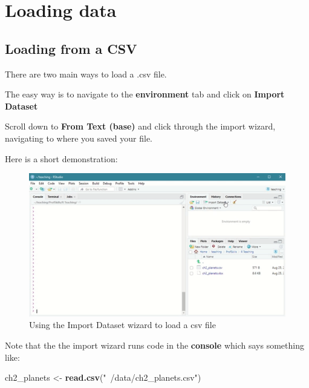\documentclass[
]{book}
\newenvironment{Shaded}{\begin{snugshade}}{\end{snugshade}}
\newcommand{\KeywordTok}[1]{\textcolor[rgb]{0.13,0.29,0.53}{\textbf{#1}}}
\newcommand{\NormalTok}[1]{#1}
\newcommand{\StringTok}[1]{\textcolor[rgb]{0.31,0.60,0.02}{#1}}
\begin{document}
\hypertarget{ex_data_load}{%
\section{Loading data}\label{ex_data_load}}

\hypertarget{loading-from-a-csv}{%
\subsection{Loading from a CSV}\label{loading-from-a-csv}}

There are two main ways to load a .csv file.

The easy way is to navigate to the \textbf{environment} tab and click on \textbf{Import Dataset}

Scroll down to \textbf{From Text (base)} and click through the import wizard, navigating to where you saved your file.

Here is a short demonstration:

\begin{figure}

{\centering \includegraphics{images/03_data/csv_open} 

}

\caption{Using the Import Dataset wizard to load a csv file}\label{fig:unnamed-chunk-58}
\end{figure}

Note that the the import wizard runs code in the \textbf{console} which says something like:

\begin{Shaded}
\begin{Highlighting}[]
\NormalTok{ch2_planets <-}\StringTok{ }\KeywordTok{read.csv}\NormalTok{(}\StringTok{"~/data/ch2_planets.csv"}\NormalTok{)}
\end{Highlighting}
\end{Shaded}
\end{document}

